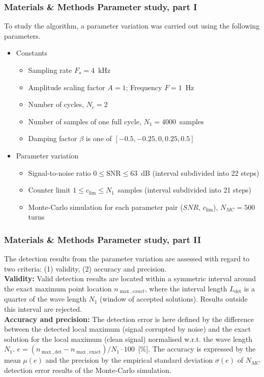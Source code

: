 \documentclass[11pt,aspectratio=169]{beamer}
\begin{document}
	\begin{frame}
		\frametitle{Materials \& Methods \textendash{} Parameter study, part I}\label{param:study}
		To study the algorithm, a parameter variation was carried out using the following parameters.\\
		\begin{itemize}
			\setlength\itemsep{0.5em}
			\item \textcolor{RIPtitlecol}{Constants}
			\begin{itemize}
				\setlength\itemsep{0.5em}
				\item Sampling rate $F_s = 4$~kHz
				\item Amplitude scaling factor $A = 1$; Frequency $F = 1$~Hz
				\item Number of cycles, $N_c = 2$
				\item Number of samples of one full cycle, $N_1 = 4000$~samples
				\item Damping factor $\beta$ is one of $[-0.5, -0.25, 0, 0.25, 0.5]$
			\end{itemize}
			\item \textcolor{RIPtitlecol}{Parameter variation}
			\begin{itemize}
				\setlength\itemsep{0.5em}
				\item Signal-to-noise ratio $0 \leq \text{SNR} \leq 63$~dB (interval subdivided into 22 steps)
				\item Counter limit $1 \leq c_{\lim} \leq N_1$~samples (interval subdivided into 21 steps)
				\item Monte-Carlo simulation for each parameter pair ($SNR$, $c_{\lim}$), $N_{MC} = 500$ turns
			\end{itemize}
		\end{itemize}
	\end{frame}
	\begin{frame}
		\frametitle{Materials \& Methods \textendash{} Parameter study, part II}
		The detection results from the parameter variation are assessed with regard to two criteria: (1) validity, (2) accuracy and precision.\\
		\vspace*{1em}
		\textbf{Validity:} Valid detection results are located within a symmetric interval around the exact maximum point location $n_{\max,exact}$, where the interval length $L_{\text{det}}$ is a quarter of the wave length $N_1$ (window of accepted solutions). Results outside this interval are rejected.\\
		\vspace*{1em}
		\textbf{Accuracy and precision:} The detection error is here defined by the difference between the detected local maximum (signal corrupted by noise) and the exact solution for the local maximum (clean signal) normalised w.r.t. the wave length $N_1$. $e = (n_{\max,\text{det}} - n_{\max,\text{exact}}) / N_1 \cdot 100$~[\%]. The accuracy is expressed by the mean $\mu(e)$ and the precision by the empirical standard deviation $\sigma(e)$ of $N_{MC}$ detection error results of the Monte-Carlo simulation.
	\end{frame}
\end{document}
